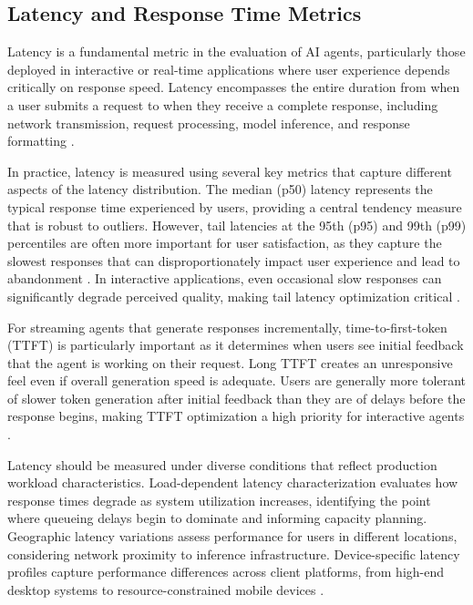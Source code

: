 \begin{TNtwocol}
\section{Latency and Response Time Metrics}
Latency is a fundamental metric in the evaluation of AI agents, particularly those deployed in interactive or real-time applications where user experience depends critically on response speed. Latency encompasses the entire duration from when a user submits a request to when they receive a complete response, including network transmission, request processing, model inference, and response formatting \cite{nielsen1993,langchain2024}.

In practice, latency is measured using several key metrics that capture different aspects of the latency distribution. The median (p50) latency represents the typical response time experienced by users, providing a central tendency measure that is robust to outliers. However, tail latencies at the 95th (p95) and 99th (p99) percentiles are often more important for user satisfaction, as they capture the slowest responses that can disproportionately impact user experience and lead to abandonment \cite{langchain2024}. In interactive applications, even occasional slow responses can significantly degrade perceived quality, making tail latency optimization critical \cite{langchain2024}.

For streaming agents that generate responses incrementally, time-to-first-token (TTFT) is particularly important as it determines when users see initial feedback that the agent is working on their request. Long TTFT creates an unresponsive feel even if overall generation speed is adequate. Users are generally more tolerant of slower token generation after initial feedback than they are of delays before the response begins, making TTFT optimization a high priority for interactive agents \cite{pope2023,langchain2024}.

Latency should be measured under diverse conditions that reflect production workload characteristics. Load-dependent latency characterization evaluates how response times degrade as system utilization increases, identifying the point where queueing delays begin to dominate and informing capacity planning. Geographic latency variations assess performance for users in different locations, considering network proximity to inference infrastructure. Device-specific latency profiles capture performance differences across client platforms, from high-end desktop systems to resource-constrained mobile devices \cite{langchain2024,shahrad2020}.


\end{TNtwocol}
